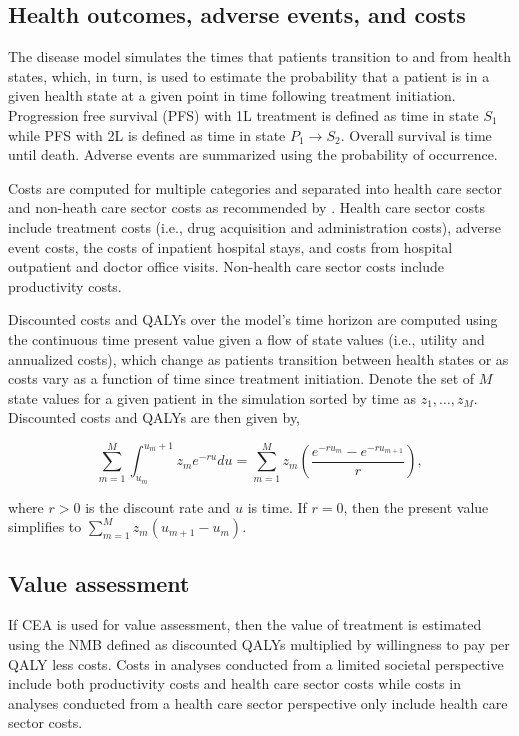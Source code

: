 \documentclass[11pt,final,fleqn]{article}\usepackage[]{graphicx}\usepackage[]{color}
\theoremstyle{plain}
\begin{document}
{\subsection{Health outcomes, adverse events, and costs}
The disease model simulates the times that patients transition to and from health states, which, in turn, is used to estimate the probability that a patient is in a given health state at a given point in time following treatment initiation. Progression free survival (PFS) with 1L treatment is defined as time in state $S_1$ while PFS with 2L is defined as time in state $P_1 \rightarrow S_2$. Overall survival is time until death. Adverse events are summarized using the probability of occurrence.  

Costs are computed for multiple categories and separated into health care sector and non-heath care sector costs as recommended by \citet{sanders2016recommendations}. Health care sector costs include treatment costs (i.e., drug acquisition and administration costs), adverse event costs, the costs of inpatient hospital stays, and costs from hospital outpatient and doctor office visits. Non-health care sector costs include productivity costs.

Discounted costs and QALYs over the model's time horizon are computed using the continuous time present value given a flow of state values (i.e., utility and annualized costs), which change as patients transition between health states or as costs vary as a function of time since treatment initiation. Denote the set of $M$ state values for a given patient in the simulation sorted by time as $z_1,\ldots, z_M$. Discounted costs and QALYs are then given by,  

\begin{equation} \label{eqn:pv}
\sum_{m = 1}^M \int_{u_m}^{u_m+1} z_me^{-ru}du = \sum_{m = 1}^M z_m \left(\frac{e^{-r{u_{m}}} - e^{-r{u_{m+1}}}}{r}\right),
\end{equation}

where $r > 0$ is the discount rate and $u$ is time. If $r = 0$, then the present value simplifies to $\sum_{m = 1}^M z_m(u_{m+1} - u_{m})$. 

\subsection{Value assessment} \label{subsec:outcomes-value-assessment}
If CEA is used for value assessment, then the value of treatment is estimated using the NMB defined as discounted QALYs multiplied by willingness to pay per QALY less costs. Costs in analyses conducted from a limited societal perspective include both productivity costs and health care sector costs while costs in analyses conducted from a health care sector perspective only include health care sector costs. 

}
\end{document}
